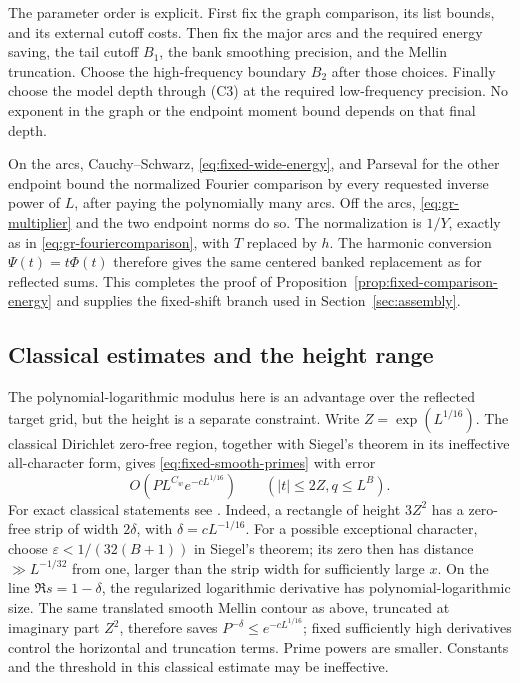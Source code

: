 The parameter order is explicit. First fix the graph comparison,
its list bounds, and its external cutoff costs. Then fix the major
arcs and the required energy saving, the tail cutoff \(B_1\),
the bank smoothing precision, and the Mellin truncation. Choose
the high-frequency boundary \(B_2\) after those choices. Finally
choose the model depth through \textup{(C3)} at the required
low-frequency precision. No exponent in the graph or the endpoint
moment bound depends on that final depth.

On the arcs, Cauchy--Schwarz, \eqref{eq:fixed-wide-energy}, and
Parseval for the other endpoint bound the normalized Fourier
comparison by every requested inverse power of \(L\), after
paying the polynomially many arcs. Off the arcs,
\eqref{eq:gr-multiplier} and the two endpoint norms do so.
The normalization is \(1/Y\), exactly as in
\eqref{eq:gr-fouriercomparison}, with \(T\) replaced by \(h\).
The harmonic conversion \(\Psi(t)=t\Phi(t)\) therefore gives
the same centered banked replacement as for reflected sums.
This completes the proof of
Proposition~\ref{prop:fixed-comparison-energy} and supplies the
fixed-shift branch used in Section~\ref{sec:assembly}.

\subsection{Classical estimates and the height range}\label{sec:fixed-classical-boundary}

The polynomial-logarithmic modulus here is an advantage over the
reflected target grid, but the height is a separate constraint.
Write \(Z=\exp(L^{1/16})\). The classical Dirichlet zero-free
region, together with Siegel's theorem in its ineffective all-character
form, gives \eqref{eq:fixed-smooth-primes} with error
\[
          O\!\left(P L^{C_w}e^{-cL^{1/16}}\right)
                      \qquad(|t|\le 2Z, q\le L^B).
\]
For exact classical statements see \cite[Proposition 51,
Theorem 62(ii) and Exercise 45(i)--(ii)]{taonotes}.
Indeed, a rectangle of height \(3Z^2\) has a zero-free strip of
width \(2\delta\), with \(\delta=cL^{-1/16}\).
For a possible exceptional character, choose
\(\varepsilon<1/(32(B+1))\) in Siegel's theorem; its zero then
has distance \(\gg L^{-1/32}\) from one, larger than the strip
width for sufficiently large \(x\). On the line
\(\Re s=1-\delta\), the regularized logarithmic derivative
has polynomial-logarithmic size. The same translated smooth Mellin
contour as above, truncated at imaginary part \(Z^2\), therefore
saves \(P^{-\delta}\le e^{-cL^{1/16}}\); fixed sufficiently high
derivatives control the horizontal and truncation terms. Prime powers
are smaller. Constants and the threshold in this classical estimate
may be ineffective.

